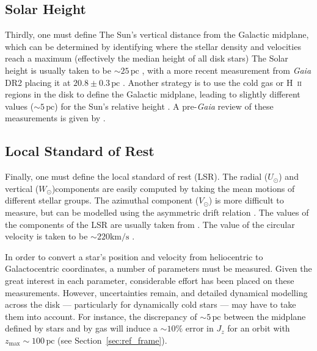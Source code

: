 \documentclass[twocolumn]{aastex62}
\newcommand{\pc}{\text{pc}}
\newcommand{\kms}{\text{km}/\text{s}}
\begin{document}
\subsection{Solar Height}
Thirdly, one must define The Sun's vertical distance from the Galactic
midplane, which can be determined by identifying where the stellar density
and velocities reach a maximum (effectively the median height of all disk
stars) The Solar height is usually taken to be $\sim 25\,\pc$
\citep{2001ApJ...553..184C}, with a more recent measurement from {\em Gaia} DR2
placing it at $20.8 \pm 0.3\,\pc$ \citep{2019MNRAS.482.1417B}. Another strategy is
to use the cold gas or H~\textsc{ii} regions in the disk to define the Galactic
midplane, leading to slightly different values ($\sim 5\,\pc$) for the Sun's
relative height \citep[e.g.][]{2019ApJ...871..145A}. A pre-{\em Gaia} review
of these measurements is given by \citet{2016ARAA..54..529B}.

\subsection{Local Standard of Rest}
Finally, one must define the local standard of rest (LSR). The radial
($U_{\odot}$) and vertical ($W_{\odot}$)components are easily computed by
taking the mean motions of different stellar groups. The azimuthal component
($V_{\odot}$) is more difficult to measure, but can be modelled using the
asymmetric drift relation \citep{2008gady.book.....B}. The values of the
components of the LSR are usually taken from \citet{2010MNRAS.403.1829S}. The
value of the circular velocity is taken to be $\sim 220\kms$
\citep[e.g.][]{2012ApJ...759..131B}.

In order to convert a star's position and velocity from heliocentric to
Galactocentric coordinates, a number of parameters must be measured. Given the
great interest in each parameter, considerable effort has been placed on these
measurements. However, uncertainties remain, and detailed dynamical modelling
across the disk --- particularly for dynamically cold stars --- may have to
take them into account. For instance, the discrepancy of $\sim 5\,\pc$ between
the midplane defined by stars and by gas will induce a $\sim10\%$ error in
$J_z$ for an orbit with $z_{\text{max}}\sim100\,\pc$ (see
Section~\ref{sec:ref_frame}).

\end{document}
